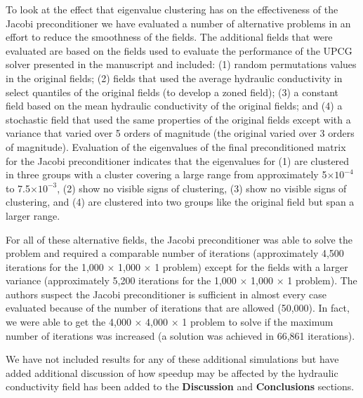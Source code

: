 \documentclass[12pt]{article} %
\begin{document}
\begin{enumerate}
To look at the effect that eigenvalue clustering has on the effectiveness of the Jacobi preconditioner we have evaluated a number of alternative problems in an effort to reduce the smoothness of the fields. The additional fields that were evaluated are based on the fields used to evaluate the performance of the UPCG solver presented in the manuscript and included: (1) random permutations values in the original fields; (2) fields that used the average hydraulic conductivity in select quantiles of the original fields (to develop a zoned field); (3) a constant field based on the mean hydraulic conductivity of the original fields; and (4) a stochastic field that used the same properties of the original fields except with a variance that varied over 5 orders of magnitude (the original varied over 3 orders of magnitude).  Evaluation of the eigenvalues of the final preconditioned matrix for the Jacobi preconditioner indicates that the eigenvalues for (1) are clustered in three groups with a cluster covering a large range from approximately 5$\times 10^{-4}$ to 7.5$\times 10^{-3}$, (2) show no visible signs of clustering, (3) show no visible signs of clustering, and (4) are clustered into two groups like the original field but span a larger range.

For all of these alternative fields, the Jacobi preconditioner was able to solve the problem and required a comparable number of iterations (approximately 4,500 iterations for the 1,000 $\times$ 1,000 $\times$ 1 problem) except for the fields with a larger variance (approximately 5,200 iterations for the 1,000 $\times$ 1,000 $\times$ 1 problem). The authors suspect the Jacobi preconditioner is sufficient in almost every case evaluated because of the number of iterations that are allowed (50,000). In fact, we were able to get the 4,000 $\times$ 4,000 $\times$ 1 problem to solve if the maximum number of iterations was increased (a solution was achieved in 66,861 iterations).

We have not included results for any of these additional simulations but have added additional discussion of how speedup may be affected by the hydraulic conductivity field has been added to the \textbf{Discussion} and \textbf{Conclusions} sections.


\end{enumerate}
\end{document}
